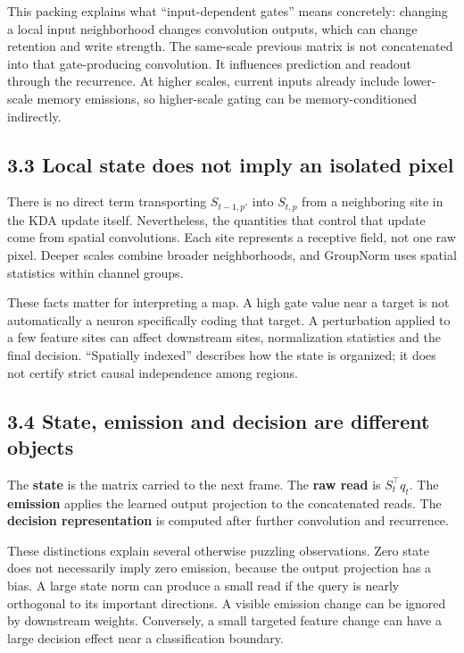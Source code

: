 \documentclass[
  11pt,
]{article}
\let\oldsubsection\subsection
\renewcommand{\subsection}{\Needspace{6\baselineskip}\oldsubsection}
\begin{document}
This packing explains what ``input-dependent gates'' means concretely:
changing a local input neighborhood changes convolution outputs, which
can change retention and write strength. The same-scale previous matrix
is not concatenated into that gate-producing convolution. It influences
prediction and readout through the recurrence. At higher scales, current
inputs already include lower-scale memory emissions, so higher-scale
gating can be memory-conditioned indirectly.

\subsection{3.3 Local state does not imply an isolated
pixel}\label{local-state-does-not-imply-an-isolated-pixel}

There is no direct term transporting \(S_{t-1,p'}\) into \(S_{t,p}\)
from a neighboring site in the KDA update itself. Nevertheless, the
quantities that control that update come from spatial convolutions. Each
site represents a receptive field, not one raw pixel. Deeper scales
combine broader neighborhoods, and GroupNorm uses spatial statistics
within channel groups.

These facts matter for interpreting a map. A high gate value near a
target is not automatically a neuron specifically coding that target. A
perturbation applied to a few feature sites can affect downstream sites,
normalization statistics and the final decision. ``Spatially indexed''
describes how the state is organized; it does not certify strict causal
independence among regions.

\subsection{3.4 State, emission and decision are different
objects}\label{state-emission-and-decision-are-different-objects}

The \textbf{state} is the matrix carried to the next frame. The
\textbf{raw read} is \(S_t^\top q_t\). The \textbf{emission} applies the
learned output projection to the concatenated reads. The
\textbf{decision representation} is computed after further convolution
and recurrence.

These distinctions explain several otherwise puzzling observations. Zero
state does not necessarily imply zero emission, because the output
projection has a bias. A large state norm can produce a small read if
the query is nearly orthogonal to its important directions. A visible
emission change can be ignored by downstream weights. Conversely, a
small targeted feature change can have a large decision effect near a
classification boundary.
\end{document}
